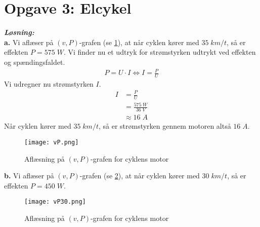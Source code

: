 \documentclass{report}
\newcommand{\sol}{\setlength{\parindent}{0cm}\textbf{\textit{Løsning:}}\setlength{\parindent}{1cm}}
\begin{document}
\section*{Opgave 3: Elcykel}
\sol \\
\textbf{a.}
Vi aflæser på $(v,P)$-grafen (se \cref{fig:vP}), at når cyklen kører med $35 \;\unit{km/t} $, så er effekten $P=575 \;\unit{W} $.
Vi finder nu et udtryk for strømstyrken udtrykt ved effekten og spændingsfaldet.
\begin{equation*}
\begin{split}
  P=U \cdot I \iff I=\frac{P}{U}
\end{split}
\end{equation*}
Vi udregner nu strømstyrken $I$.
\begin{equation*}
\begin{split}
  I&=\frac{P}{U}\\
  &=\frac{575 \;\unit{W} }{36 \;\unit{V} }\\
  &\approx 16 \;\unit{A} 
\end{split}
\end{equation*}
Når cyklen kører med $35 \;\unit{km/t} $, så er strømstyrken gennem motoren altså $16 \;\unit{A} $.
\begin{figure}[H]
\begin{center}
  \texttt{[image: vP.png]}
\end{center}
  \caption{Aflæsning på $(v,P)$-grafen for cyklens motor}
\label{fig:vP}
\end{figure}
\noindent \textbf{b.}
Vi aflæser på $(v,P)$-grafen (se \cref{fig:vP30}), at når cyklen kører med $30 \;\unit{km/t} $, så er effekten $P=450 \;\unit{W} $.
\begin{figure}[H]
\begin{center}
  \texttt{[image: vP30.png]}
\end{center}
  \caption{Aflæsning på $(v,P)$-grafen for cyklens motor}
\label{fig:vP30}
\end{figure}
\end{document}
